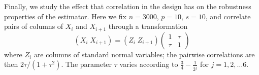 Finally, we study the effect that correlation in the design has on the robustness properties
of the estimator. Here we fix $n=3000$, $p=10$, $s=10$, and correlate pairs of columns of $X_{i}$ and $X_{i+1}$
through a transformation 
\begin{equation*}
  (X_{i} \; X_{i+1}) = (Z_{i} \; Z_{i+1}) \begin{pmatrix}1 & \tau \\ \tau & 1\end{pmatrix}
\end{equation*}
where $Z_i$ are columns of standard normal variables; the pairwise correlations are then $2\tau/(1+\tau^2)$.
The parameter $\tau$ varies according to $\frac{3}{4} - \frac{1}{2^j}$ 
for $j=1,2,\ldots 6$.

